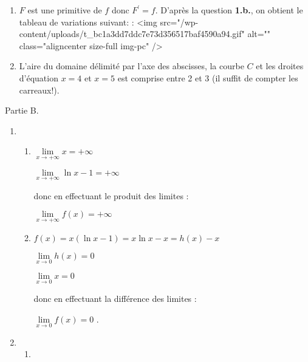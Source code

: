 \begin{corrige}
\begin{enumerate}
\begin{enumerate}
\begin{center}
\begin{extern}
{\begin{tikzpicture}[scale=.8, line width=.5pt, dark]
       \end{tikzpicture}
      }
   \end{extern}
\end{center}
\item
               $F$ est une primitive de $f$ donc $F^{\prime}=f$. D'après la question \textbf{1.b.}, on obtient le tableau de variations suivant: :
               <img src="/wp-content/uploads/t_bc1a3dd7ddc7e73d356517baf4590a94.gif" alt="" class="aligncenter size-full  img-pc" />
               \item
               L'aire du domaine délimité par l'axe des abscisses, la courbe $C$ et les droites d'équation $x=4$ et $x=5$ est comprise entre 2 et 3 (il suffit de compter les carreaux!).
          \end{enumerate}
     \end{enumerate}
     \begin{h3}Partie B.\end{h3}
     \begin{enumerate}
          \item
          \begin{enumerate}[label=\alph*.]
               \item
               $\lim\limits_{x\rightarrow +\infty }x=+\infty $
               \par
               $\lim\limits_{x\rightarrow +\infty }\ln x-1=+\infty $
               \par
               donc en effectuant le produit des limites :
               \par
               $\lim\limits_{x\rightarrow +\infty }f\left(x\right)=+\infty $
               \item
               $f\left(x\right)=x\left(\ln x-1\right)=x\ln x-x=h\left(x\right)-x$
               \par
               $\lim\limits_{x\rightarrow 0}h\left(x\right)=0$
               \par
               $\lim\limits_{x\rightarrow 0}x=0$
               \par
               donc en effectuant la différence des limites :
               \par
               $\lim\limits_{x\rightarrow 0}f\left(x\right)=0$
               .
          \end{enumerate}
          \item
          \begin{enumerate}[label=\alph*.]
               \item

\end{enumerate}
\end{enumerate}
\end{corrige}
